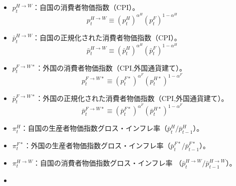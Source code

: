 \begin{itemize}
\begin{equation}
        \end{equation}
    \item
    \label{itm:model_variables_endogenous_aggregate_p_H_W}
        \(p_t^{H\to W}\)：自国の消費者物価指数（CPI）。
        \begin{equation}
        \label{form:model_variables_endogenous_aggregate_p_H_W_def}
            p_t^{H\to W}\equiv(p_t^H)^{\alpha^H}(p_t^F)^{1-\alpha^H}
        \end{equation}
    \item
    \label{itm:model_variables_endogenous_aggregate_p_H_W_bar}
        \(\bar{p}_t^{H\to W}\)：自国の正規化された消費者物価指数（CPI）。
        \begin{equation}
        \label{form:model_variables_endogenous_aggregate_p_H_W_bar_def}
            \bar{p}_t^{H\to W}\equiv(\bar{p}_t^H)^{\alpha^H}(\bar{p}_t^F)^{1-\alpha^H}
        \end{equation}
    \item
    \label{itm:model_variables_endogenous_aggregate_p_F_W_star}
        \(p_t^{F\to W*}\)：外国の消費者物価指数（CPI,外国通貨建て）。
        \begin{equation}
        \label{form:model_variables_endogenous_aggregate_p_F_W_star_def}
            p_t^{F\to W*}\equiv(p_t^{F*})^{\alpha^F}(p_t^{H*})^{1-\alpha^F}
        \end{equation}
    \item
    \label{itm:model_variables_endogenous_aggregate_p_F_W_star_bar}
        \(\bar{p}_t^{F\to W*}\)：外国の正規化された消費者物価指数（CPI,外国通貨建て）。
        \begin{equation}
        \label{form:model_variables_endogenous_aggregate_p_F_W_star_bar_def}
            \bar{p}_t^{F\to W*}\equiv(\bar{p}_t^{F*})^{\alpha^F}(\bar{p}_t^{H*})^{1-\alpha^F}
        \end{equation}
    \item
    \label{itm:model_variables_endogenous_aggregate_pi_H}
        \(\pi_t^H\)：自国の生産者物価指数グロス・インフレ率（\(\bar{p}_t^H/\bar{p}_{t-1}^H\)）。
    \item
    \label{itm:model_variables_endogenous_aggregate_pi_F_star}
        \(\pi_t^{F*}\)：外国の生産者物価指数グロス・インフレ率（\(\bar{p}_t^{F*}/\bar{p}_{t-1}^{F*}\)）。
    \item
    \label{itm:model_variables_endogenous_aggregate_pi_H_W}
        \(\pi_t^{H\to W}\)：自国の消費者物価指数グロス・インフレ率
        （\(\bar{p}_t^{H\to W}/\bar{p}_{t-1}^{H\to W}\)）。
    \item

\end{itemize}
